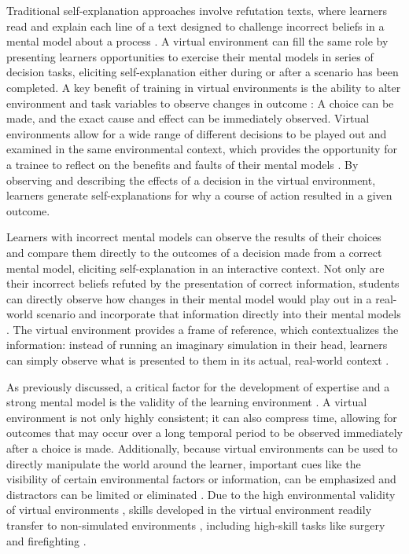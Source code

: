 Traditional self-explanation approaches involve refutation texts, where learners read and explain each line of a text designed to challenge incorrect beliefs in a mental model about a process \citep{Chi1994}. A virtual environment can fill the same role by presenting learners opportunities to exercise their mental models in series of decision tasks, eliciting self-explanation either during or after a scenario has been completed. A key benefit of training in virtual environments is the ability to alter environment and task variables to observe changes in outcome \citep{Klein2006}: A choice can be made, and the exact cause and effect can be immediately observed. Virtual environments allow for a wide range of different decisions to be played out and examined in the same environmental context, which provides the opportunity for a trainee to reflect on the benefits and faults of their mental models \citep{Salzman1999}. By observing and describing the effects of a decision in the virtual environment, learners generate self-explanations for why a course of action resulted in a given outcome.

Learners with incorrect mental models can observe the results of their choices and compare them directly to the outcomes of a decision made from a correct mental model, eliciting self-explanation in an interactive context. Not only are their incorrect beliefs refuted by the presentation of correct information, students can directly observe how changes in their mental model would play out in a real-world scenario and incorporate that information directly into their mental models \citep{Salzman1999}. The virtual environment provides a frame of reference, which contextualizes the information: instead of running an imaginary simulation in their head, learners can simply observe what is presented to them in its actual, real-world context \citep{Erickson1993}.

As previously discussed, a critical factor for the development of expertise and a strong mental model is the validity of the learning environment \citep{Klein2006, Kahneman2009}. A virtual environment is not only highly consistent; it can also compress time, allowing for outcomes that may occur over a long temporal period to be observed immediately after a choice is made. Additionally, because virtual environments can be used to directly manipulate the world around the learner, important cues like the visibility of certain environmental factors or information, can be emphasized and distractors can be limited or eliminated \citep{Salzman1999}. Due to the high environmental validity of virtual environments \citep{Loomis1999}, skills developed in the virtual environment readily transfer to non-simulated environments \citep{Cromby1996, Watanuki2007}, including high-skill tasks like surgery \citep{Seymour2002} and firefighting \citep{Bliss1997}.

